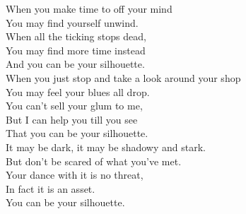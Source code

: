 


When you make time to  off your mind \\
You may find yourself unwind. \\
When all the ticking stops dead, \\
You may find more time instead \\
And you can be your silhouette. \\

When you just stop and take a look around your shop \\
You may feel your blues all drop. \\
You can't sell your glum to me, \\
But I can help you till you see \\
That you can be your silhouette. \\

It may be dark, it may be shadowy and stark. \\
But don't be scared of what you've met. \\
Your dance with it is no threat, \\
In fact it is an asset. \\
You can be your silhouette. \\




